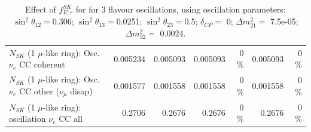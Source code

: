 \begin{table}
\begin{tabular}{| l | r | r | r  r | r  r |}
                          $N_{SK}$ (1 $\mu$-like ring): Osc. $\nu_e$ CC coherent &        0.005234 &        0.005093 &        0.005093 &        0 \%  &        0.005093 &        0 \%  \\ 
           $N_{SK}$ (1 $\mu$-like ring): Osc. $\nu_e$ CC other ($\nu_\mu$ disap) &        0.001577 &        0.001558 &        0.001558 &        0 \%  &        0.001558 &        0 \%  \\ 
                        $N_{SK}$ (1 $\mu$-like ring): oscillation $\nu_e$ CC all &          0.2706 &          0.2676 &          0.2676 &        0 \%  &          0.2676 &        0 \%  \\ 
\hline
\hline
\end{tabular}
\caption{ Effect of $f_{E; r}^{SK}$   for for 3 flavour oscillations, using oscillation parameters:  $\sin^2\theta_{12} = $0.306; $\sin^2\theta_{13} = $0.0251; $\sin^2\theta_{23} = $0.5; $\delta_{CP} = $        0; $\Delta m^2_{21} = $    7.5e-05; $\Delta m^2_{32} = $    0.0024. }
\label{tab:num_sk_energy_scale_1RmuT_3f_osc_t13:0.0251_spectralreco_spectraltrue}
\end{table}
\clearpage
